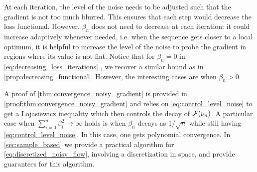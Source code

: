 \begin{remark}
	At each iteration, the level of the noise needs to be adjusted such that the gradient is not too much blurred. This ensures that each step would decrease the loss functional. However, $\beta_n$ does not need to decrease at each iteration: it could increase adaptively whenever needed, i.e. when  the sequence gets closer to a local optimum, it is helpful to increase the level of the noise to probe the gradient in regions where its value is not flat.
	Notice that for $\beta_n = 0$  in \cref{eq:decreasing_loss_iterations} , we recover a similar bound as in \cref{prop:decreasing_functional}. However, the interesting cases are when $\beta_n>0$.
 \end{remark}
A proof of \cref{thm:convergence_noisy_gradient} is provided in \cref{proof:thm:convergence_noisy_gradient} and relies on \cref{eq:control_level_noise} to get a Lojasiewicz inequality which then controls the decay of ${{\mathcal F}}(\nu_n)$. A particular case when $\sum_{i=0}^n \beta_i^2 \rightarrow \infty$ holds is when $\beta_n$ decays as $1/\sqrt{n}$ while still having \cref{eq:control_level_noise}. In this case, one gets polynomial convergence.
In \cref{sec:sample_based} we provide a practical algorithm for \cref{eq:discretized_noisy_flow}, involving a discretization in space, and provide guarantees for this algorithm.
 
 
 
